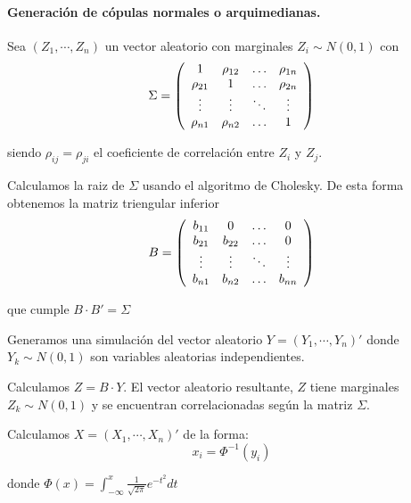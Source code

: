 \paragraph{Generaci\'on de c\'opulas normales o arquimedianas.}

Sea $(Z_1,\cdots, Z_n)$ un vector aleatorio con marginales $Z_i \sim N(0,1)$ con
\begin{displaymath}
\Sigma = \left( 
\begin{array}{cccc}
1          & \rho_{12} & \ldots & \rho_{1n} \cr
\rho_{21} & 1          & \ldots & \rho_{2n} \cr
\vdots    & \vdots    & \ddots & \vdots   \cr
\rho_{n1} & \rho_{n2} & \ldots & 1
\end{array}
\right)
\end{displaymath}

\noindent siendo $\rho_{ij} = \rho_{ji}$ el coeficiente de correlaci\'on entre 
$Z_i$ y $Z_j$.

\noindent Calculamos la raiz de $\Sigma$ usando el algoritmo de Cholesky. 
De esta forma obtenemos la matriz triengular inferior
\begin{displaymath}
B = 
\left(
\begin{array}{cccc}
b_{11}   & 0        & \ldots & 0       \cr
b_{21}   & b_{22}   & \ldots & 0       \cr
\vdots  & \vdots  & \ddots & \vdots \cr
b_{n1}   & b_{n2}   & \ldots & b_{nn}
\end{array}
\right)
\end{displaymath}

\noindent que cumple $B \cdot B' = \Sigma$

\noindent Generamos una simulaci\'on del vector aleatorio $Y=(Y_1, \cdots, Y_n)'$ 
donde $Y_k \sim N(0,1)$ son variables aleatorias independientes.

\noindent Calculamos $Z = B \cdot Y$. El vector aleatorio resultante, $Z$ tiene
marginales $Z_k \sim N(0,1)$ y se encuentran correlacionadas seg\'un la matriz 
$\Sigma$.

\noindent Calculamos $X = (X_1, \cdots, X_n)'$ de la forma:
\begin{displaymath}
x_i = \Phi^{-1}(y_i)
\end{displaymath}

\noindent donde $\Phi(x) = \int_{-\infty}^{x} \frac{1}{\sqrt{2 \pi}} e^{-t^2} dt$
